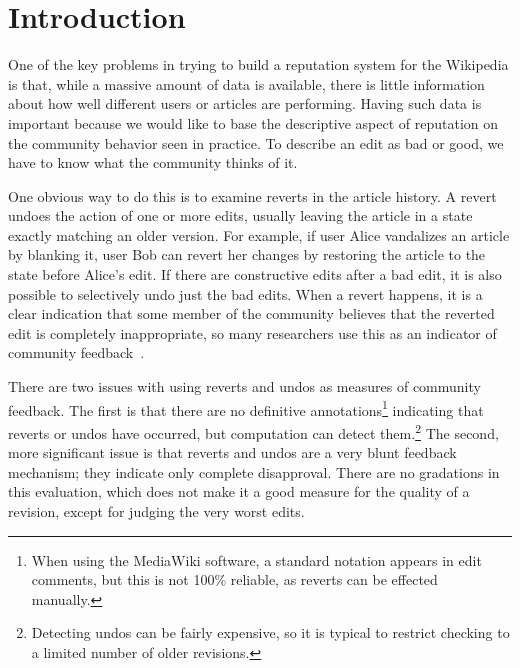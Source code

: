 \section{Introduction}

One of the key problems in trying to build a reputation system
for the Wikipedia is that, while a massive amount of
data is available, there is little information about how well different
users or articles are performing.
Having such data is important because we would like to base the
descriptive aspect of reputation on the community behavior seen
in practice.
To describe an edit as bad or good, we have to know what the
community thinks of it.

One obvious way to do this is to examine reverts
in the article history.
A revert undoes the action of one or more edits, usually leaving
the article in a state exactly matching an older version.
For example, if user Alice vandalizes an article by blanking it,
user Bob can revert her changes by restoring the article to the
state before Alice's edit.
If there are constructive edits after a bad edit, it is also possible
to selectively undo just the bad edits.
When a revert happens, it is a clear indication that some member
of the community believes that the reverted edit is completely
inappropriate, so many researchers use this as an indicator of
community feedback~\cite{Adler2007,Smets2008,Itakura2009,Belani2010}.

There are two issues with using reverts and undos
as measures of community feedback.
The first is that there are no definitive
annotations\footnote{When using the MediaWiki software,
a standard notation appears in edit comments,
but this is not 100\% reliable, as reverts can be effected manually.}
indicating that reverts or undos have occurred,
but computation can detect
them.\footnote{Detecting undos can be fairly expensive, so
it is typical to restrict checking to a limited number of older revisions.}
The second, more significant issue is that reverts and undos
are a very blunt feedback mechanism; they indicate only complete disapproval.
There are no gradations in this evaluation, which does not make
it a good measure for the quality of a revision, except for judging the very
worst edits.

